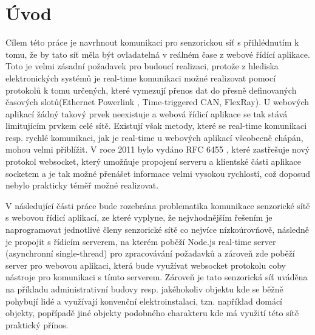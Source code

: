 \chapter{Úvod}
Cílem této práce je navrhnout komunikaci pro senzorickou síť s přihlédnutím k tomu, že by tato síť měla být ovladatelná v reálném čase z webové řídící aplikace. Toto je velmi zásadní požadavek pro budoucí realizaci, protože z hlediska elektronických systémů je real-time  komunikaci možné realizovat pomocí protokolů k tomu určených, které vymezují přenos dat do přesně definovaných časových slotů(Ethernet Powerlink , Time-triggered CAN, FlexRay).  U webových aplikací žádný takový prvek neexistuje a webová řídicí aplikace se tak stává limitujícím prvkem celé sítě. Existují však metody, které se real-time komunikaci resp. rychlé komunikaci, jak je real-time u webových aplikací všeobecně chápán, mohou velmi přiblížit. V roce 2011 bylo vydáno RFC 6455 \cite{rfc6455}, které zastřešuje nový protokol  websocket, který umožňuje propojení serveru a klientské části aplikace socketem a je tak možné přenášet informace velmi vysokou rychlostí, což doposud nebylo prakticky téměř možné realizovat.

V následující části práce bude rozebrána problematika komunikace senzorické sítě s webovou řídicí aplikací, ze které vyplyne, že nejvhodnějším řešením je naprogramovat jednotlivé členy senzorické sítě co nejvíce ní\-zko\-ú\-rov\-ňo\-vě, následně je propojit s řídicím serverem, na kterém poběží  Node.js real-time server (asynchronní single-thread) pro zpracovávání požadavků a zároveň zde poběží server pro webovou aplikaci, která bude využívat websocket protokolu coby nástroje pro komunikaci s tímto serverem. Zároveň je tato senzorická síť uváděna na příkladu administrativní budovy resp. jakéhokoliv objektu kde se běžně pohybují lidé a využívají konvenční elektroinstalaci, tzn. například domácí objekty, popřípadě jiné objekty podobného charakteru kde má využití této sítě praktický přínos.